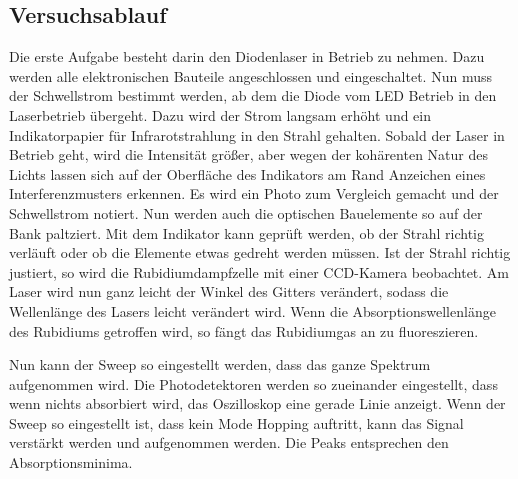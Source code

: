 \subsection{Versuchsablauf}
Die erste Aufgabe besteht darin den Diodenlaser in Betrieb zu nehmen. Dazu werden alle elektronischen Bauteile angeschlossen und eingeschaltet.
Nun muss der Schwellstrom bestimmt werden, ab dem die Diode vom LED Betrieb in den Laserbetrieb übergeht. Dazu wird der Strom langsam erhöht und ein Indikatorpapier 
für Infrarotstrahlung in den Strahl gehalten. Sobald der Laser in Betrieb geht, wird die Intensität größer, aber wegen der kohärenten Natur des Lichts 
lassen sich auf der Oberfläche des Indikators am Rand Anzeichen eines Interferenzmusters erkennen. Es wird ein Photo zum Vergleich gemacht und der Schwellstrom notiert.
Nun werden auch die optischen Bauelemente so auf der Bank paltziert. Mit dem Indikator kann geprüft werden, ob der Strahl richtig verläuft oder 
ob die Elemente etwas gedreht werden müssen. Ist der Strahl richtig justiert, so wird die Rubidiumdampfzelle mit einer CCD-Kamera beobachtet.
Am Laser wird nun ganz leicht der Winkel des Gitters verändert, sodass die Wellenlänge des Lasers leicht verändert wird. Wenn die Absorptionswellenlänge 
des Rubidiums getroffen wird, so fängt das Rubidiumgas an zu fluoreszieren.

\noindent Nun kann der Sweep so eingestellt werden, dass das ganze Spektrum aufgenommen wird. Die Photodetektoren werden so zueinander eingestellt, dass wenn nichts absorbiert wird,
das Oszilloskop eine gerade Linie anzeigt. Wenn der Sweep so eingestellt ist, dass kein Mode Hopping auftritt, kann das Signal verstärkt werden und aufgenommen werden. 
Die Peaks entsprechen den Absorptionsminima.